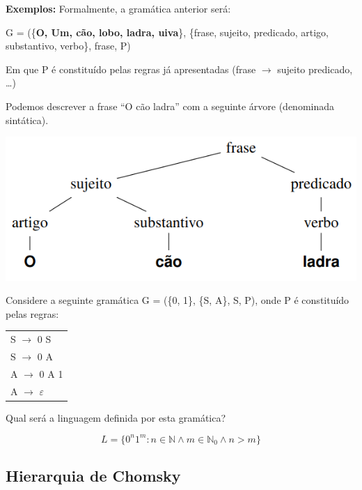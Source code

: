 \documentclass{article}
\begin{document}
\begin{flushleft}
  \textbf{Exemplos:} Formalmente, a gramática anterior será:\break

  G = (\{\textbf{O, Um, cão, lobo, ladra, uiva}\}, \{frase, sujeito, predicado, artigo, substantivo, verbo\},
  frase, P)\break

  Em que P é constituído pelas regras já apresentadas (frase $\rightarrow$ sujeito predicado, \dots)\break

  Podemos descrever a frase “O cão ladra” com a seguinte
  árvore (denominada sintática).

  \begin{center}
    \includegraphics[scale=0.3]{13}
  \end{center}
\end{flushleft}

\begin{flushleft}
  Considere a seguinte gramática G = (\{0, 1\}, \{S, A\}, S, P), onde P é constituído pelas
  regras:

  \begin{center}
    \begin{tabular}{l}
      S $\rightarrow$ 0 S\\
      S $\rightarrow$ 0 A\\
      A $\rightarrow$ 0 A 1\\
      A $\rightarrow$ $\varepsilon$\\
    \end{tabular}
  \end{center}

  Qual será a linguagem definida por esta gramática?

  \[L = \{0^n 1^m : n \in \mathbb{N} \wedge m \in \mathbb{N}_0 \wedge n > m\}\]
\end{flushleft}

\subsection{Hierarquia de Chomsky}
\end{document}
